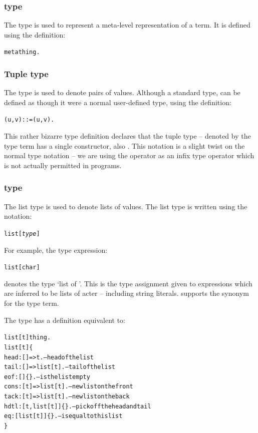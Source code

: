 \subsubsection{ type}
\label{types:standard:meta}

The  type is used to represent a meta-level representation of a term. It is defined using the definition:
\begin{alltt}
meta \impl thing.
\end{alltt}

\subsubsection{Tuple type}
\label{types:standard:tuple}

The \q{,} type is used to denote pairs of values. Although a standard type, \q{,} can be defined as though it were a normal user-defined type, using the definition:
\begin{alltt}
(u,v) ::= (u,v).
\end{alltt}
This rather bizarre type definition declares that the tuple type -- denoted by the type term  has a single constructor, also . This notation is a slight twist on the normal type notation -- we are using the \q{,} operator as an infix type operator which is not actually permitted in programs.

\subsubsection{ type}
\label{types:standard:list}

The list type is used to denote lists of values. The list type is written using the notation:
\begin{alltt}
list[\emph{type}]
\end{alltt}
For example, the type expression:
\begin{alltt}
list[char]
\end{alltt}
denotes the type `list of '. This is the type assignment given to expressions which are inferred to be lists of acter -- including string literals. \go supports the  synonym for the  type term.

The  type has a definition equivalent to:
\begin{alltt}
list[t] \impl thing.
list[t] \impl \{
    head:[]=>t.                -- head of the list
    tail:[]=>list[t].          -- tail of the list
    eof:[]\{\}.                  -- is the list empty
    cons:[t]=>list[t].         -- new list on the front
    tack:[t]=>list[t].         -- new list on the back
    hdtl:[t,list[t]]\{\}.        -- pick off the head and tail
    eq:[list[t]]\{\}.            -- is equal to this list
\}
\end{alltt}

